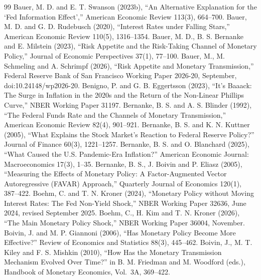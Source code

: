 \documentclass[11pt]{article}
\begin{document}
\begin{thebibliography}{99}
 Bauer, M. D. and E. T. Swanson (2023b), ``An Alternative Explanation for the `Fed Information Effect','' American Economic Review 113(3), 664--700.
 Bauer, M. D. and G. D. Rudebusch (2020), ``Interest Rates under Falling Stars,'' American Economic Review 110(5), 1316--1354.
 Bauer, M. D., B. S. Bernanke and E. Milstein (2023), ``Risk Appetite and the Risk-Taking Channel of Monetary Policy,'' Journal of Economic Perspectives 37(1), 77--100.
 Bauer, M., M. Schmeling and A. Schrimpf (2026), ``Risk Appetite and Monetary Transmission,'' Federal Reserve Bank of San Francisco Working Paper 2026-20, September, doi:10.24148/wp2026-20.
 Benigno, P. and G. B. Eggertsson (2023), ``It's Baaack: The Surge in Inflation in the 2020s and the Return of the Non-Linear Phillips Curve,'' NBER Working Paper 31197.
 Bernanke, B. S. and A. S. Blinder (1992), ``The Federal Funds Rate and the Channels of Monetary Transmission,'' American Economic Review 82(4), 901--921.
 Bernanke, B. S. and K. N. Kuttner (2005), ``What Explains the Stock Market's Reaction to Federal Reserve Policy?'' Journal of Finance 60(3), 1221--1257.
 Bernanke, B. S. and O. Blanchard (2025), ``What Caused the U.S. Pandemic-Era Inflation?'' American Economic Journal: Macroeconomics 17(3), 1--35.
 Bernanke, B. S., J. Boivin and P. Eliasz (2005), ``Measuring the Effects of Monetary Policy: A Factor-Augmented Vector Autoregressive (FAVAR) Approach,'' Quarterly Journal of Economics 120(1), 387--422.
 Boehm, C. and T. N. Kroner (2024), ``Monetary Policy without Moving Interest Rates: The Fed Non-Yield Shock,'' NBER Working Paper 32636, June 2024, revised September 2025.
 Boehm, C., H. Kim and T. N. Kroner (2026), ``The Main Monetary Policy Shock,'' NBER Working Paper 36004, November.
 Boivin, J. and M. P. Giannoni (2006), ``Has Monetary Policy Become More Effective?'' Review of Economics and Statistics 88(3), 445--462.
 Boivin, J., M. T. Kiley and F. S. Mishkin (2010), ``How Has the Monetary Transmission Mechanism Evolved Over Time?'' in B. M. Friedman and M. Woodford (eds.), Handbook of Monetary Economics, Vol.\ 3A, 369--422.

\end{thebibliography}
\end{document}
